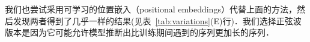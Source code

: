 
我们也尝试采用可学习的位置嵌入（positional embeddings）\citep{JonasFaceNet2017}代替上面的方法，然后发现两者得到了几乎一样的结果(见表~\ref{tab:variations}(E)行)．我们选择正弦波版本是因为它可能允许模型推断出比训练期间遇到的序列更加长的序列．